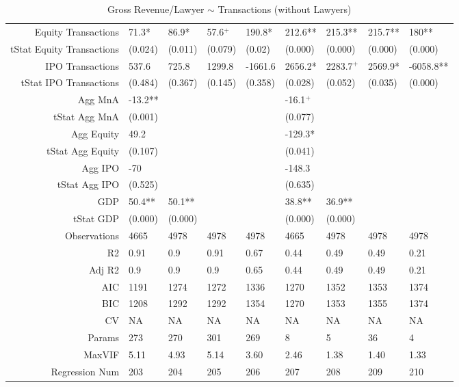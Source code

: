 \begin{table}[ht]
\begin{tabular}{rllllllll}
  Equity Transactions & 71.3* & 86.9* & 57.6$^{+}$ & 190.8* & 212.6** & 215.3** & 215.7** & 180** \\ 
  tStat Equity Transactions & (0.024) & (0.011) & (0.079) & (0.02) & (0.000) & (0.000) & (0.000) & (0.000) \\ 
  IPO Transactions & 537.6 & 725.8 & 1299.8 & -1661.6 & 2656.2* & 2283.7$^{+}$ & 2569.9* & -6058.8** \\ 
  tStat IPO Transactions & (0.484) & (0.367) & (0.145) & (0.358) & (0.028) & (0.052) & (0.035) & (0.000) \\ 
  Agg MnA & -13.2** &  &  &  & -16.1$^{+}$ &  &  &  \\ 
  tStat Agg MnA & (0.001) &  &  &  & (0.077) &  &  &  \\ 
  Agg Equity & 49.2 &  &  &  & -129.3* &  &  &  \\ 
  tStat Agg Equity & (0.107) &  &  &  & (0.041) &  &  &  \\ 
  Agg IPO & -70 &  &  &  & -148.3 &  &  &  \\ 
  tStat Agg IPO & (0.525) &  &  &  & (0.635) &  &  &  \\ 
  GDP & 50.4** & 50.1** &  &  & 38.8** & 36.9** &  &  \\ 
  tStat GDP & (0.000) & (0.000) &  &  & (0.000) & (0.000) &  &  \\ 
  Observations & 4665 & 4978 & 4978 & 4978 & 4665 & 4978 & 4978 & 4978 \\ 
  R2 & 0.91 & 0.9 & 0.91 & 0.67 & 0.44 & 0.49 & 0.49 & 0.21 \\ 
  Adj R2 & 0.9 & 0.9 & 0.9 & 0.65 & 0.44 & 0.49 & 0.49 & 0.21 \\ 
  AIC & 1191 & 1274 & 1272 & 1336 & 1270 & 1352 & 1353 & 1374 \\ 
  BIC & 1208 & 1292 & 1292 & 1354 & 1270 & 1353 & 1355 & 1374 \\ 
  CV & NA & NA & NA & NA & NA & NA & NA & NA \\ 
  Params & 273 & 270 & 301 & 269 & 8 & 5 & 36 & 4 \\ 
  MaxVIF & 5.11 & 4.93 & 5.14 & 3.60 & 2.46 & 1.38 & 1.40 & 1.33 \\ 
  Regression Num & 203 & 204 & 205 & 206 & 207 & 208 & 209 & 210 \\ 
   \hline
\end{tabular}
\caption{Gross Revenue/Lawyer $\sim$ Transactions (without Lawyers)} 
\end{table}
